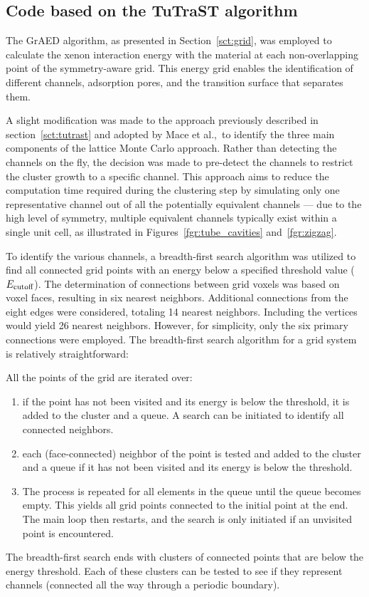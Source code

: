 \documentclass[main]{subfiles}
\begin{document}
\subsection{Code based on the TuTraST algorithm}

The GrAED algorithm, as presented in Section~\ref{sct:grid}, was employed to calculate the xenon interaction energy with the material at each non-overlapping point of the symmetry-aware grid. This energy grid enables the identification of different channels, adsorption pores, and the transition surface that separates them.

A slight modification was made to the approach previously described in section~\ref{sct:tutrast} and adopted by Mace et al.,\ to identify the three main components of the lattice Monte Carlo approach. Rather than detecting the channels on the fly, the decision was made to pre-detect the channels to restrict the cluster growth to a specific channel. This approach aims to reduce the computation time required during the clustering step by simulating only one representative channel out of all the potentially equivalent channels --- due to the high level of symmetry, multiple equivalent channels typically exist within a single unit cell, as illustrated in Figures~\ref{fgr:tube_cavities} and~\ref{fgr:zigzag}.

To identify the various channels, a breadth-first search algorithm was utilized to find all connected grid points with an energy below a specified threshold value ($E_{\text{cutoff}}$). The determination of connections between grid voxels was based on voxel faces, resulting in six nearest neighbors. Additional connections from the eight edges were considered, totaling 14 nearest neighbors. Including the vertices would yield 26 nearest neighbors. However, for simplicity, only the six primary connections were employed. The breadth-first search algorithm for a grid system is relatively straightforward:

All the points of the grid are iterated over:
  \begin{enumerate}
    \item if the point has not been visited and its energy is below the threshold, it is added to the cluster and a queue. A search can be initiated to identify all connected neighbors.
    \item each (face-connected) neighbor of the point is tested and added to the cluster and a queue if it has not been visited and its energy is below the threshold.
    \item The process is repeated for all elements in the queue until the queue becomes empty. This yields all grid points connected to the initial point at the end. The main loop then restarts, and the search is only initiated if an unvisited point is encountered.
  \end{enumerate}
The breadth-first search ends with clusters of connected points that are below the energy threshold. Each of these clusters can be tested to see if they represent channels (connected all the way through a periodic boundary).
\end{document}
